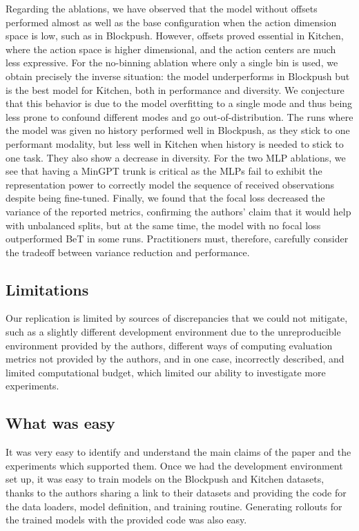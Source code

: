 Regarding the ablations,
we have observed that the model without offsets performed almost as well as the base configuration when the action dimension space is low, such as in Blockpush.
However, offsets proved essential in Kitchen, where the action space is higher dimensional, and the action centers are much less expressive.
For the no-binning ablation where only a single bin is used, we obtain precisely the inverse situation: the model underperforms in Blockpush but is the best model for Kitchen, both in performance and diversity.
We conjecture that this behavior is due to the model overfitting to a single mode and thus being less prone to confound different modes and go out-of-distribution.
The runs where the model was given no history performed well in Blockpush, as they stick to one performant modality, but less well in Kitchen when history is needed to stick to one task.
They also show a decrease in diversity.
For the two MLP ablations, we see that having a MinGPT trunk is critical as the MLPs fail to exhibit the representation power to correctly model the sequence of received observations despite being fine-tuned.
Finally, we found that the focal loss decreased the variance of the reported metrics, confirming the authors' claim that it would help with unbalanced splits, but at the same time, the model with no focal loss outperformed BeT in some runs.
Practitioners must, therefore, carefully consider the tradeoff between variance reduction and performance.

\subsection{Limitations}
Our replication is limited by sources of discrepancies that we could not mitigate, such as a slightly different development environment due to the unreproducible environment provided by the authors, different ways of computing evaluation metrics not provided by the authors, and in one case, incorrectly described, and limited computational budget, which limited our ability to investigate more experiments.


\subsection{What was easy}
It was very easy to identify and understand the main claims of the paper and the experiments which supported them.
Once we had the development environment set up, it was easy to train models on the Blockpush and Kitchen datasets, thanks to the authors sharing a link to their datasets and providing the code for the data loaders, model definition, and training routine.
Generating rollouts for the trained models with the provided code was also easy.


